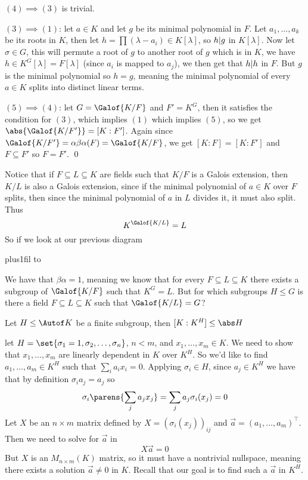 $(4)\implies(3)$ is trivial.

$(3)\implies(1)$: let $a\in K$ and let $g$ be its minimal polynomial in $F$.
Let $a_1,\dots,a_k$ be its roots in $K$, then let $h=\prod(\lambda-a_i)\in K[\lambda]$, so $h{\mid} g$ in $K[\lambda]$.
Now let $\sigma\in G$, this will permute a root of $g$ to another root of $g$ which is in $K$, we have $h\in K^G[\lambda]=F[\lambda]$ (since $a_i$ is mapped to $a_j$), we then get that $h{\mid} h$ in $F$.
But $g$ is the minimal polynomial so $h=g$, meaning the minimal polynomial of every $a\in K$ splits into distinct linear terms.

$(5)\implies(4)$: let $G=\Galof{K/F}$ and $F'=K^G$, then it satisfies the condition for $(3)$, which implies $(1)$ which implies $(5)$, so we get $\abs{\Galof{K/F'}}=[K:F']$.
Again since $\Galof{K/F'}=\alpha\beta\alpha(F)=\Galof{K/F}$, we get $[K:F]=[K:F']$ and $F\subseteq F'$ so $F=F'$.
\qed

Notice that if $F\subseteq L\subseteq K$ are fields such that $K/F$ is a Galois extension, then $K/L$ is also a Galois extension, since if the minimal polynomial of $a\in K$ over $F$ splits, then since the
minimal polynomial of $a$ in $L$ divides it, it must also split.
Thus
$$ K^{\Galof{K/L}} = L $$
So if we look at our previous diagram

\medskip
{\tabskip=0pt plus1fil
\offinterlineskip\halign to}
\medskip

We have that $\beta\alpha=1$, meaning we know that for every $F\subseteq L\subseteq K$ there exists a subgroup of $\Galof{K/F}$ such that $K^G=L$.
But for which subgroups $H\leq G$ is there a field $F\subseteq L\subseteq K$ such that $\Galof{K/L}=G$?

\blemm[title=Artin's Lemma, name=artinlemma]

    Let $H\leq\Autof K$ be a finite subgroup, then $[K:K^H]\leq\abs H$

\elemm

\Proof let $H=\set{\sigma_1=1,\sigma_2,\dots,\sigma_n}$, $n<m$, and $x_1,\dots,x_m\in K$.
We need to show that $x_1,\dots,x_m$ are linearly dependent in $K$ over $K^H$.
So we'd like to find $a_1,\dots,a_m\in K^H$ such that $\sum_ia_ix_i=0$.
Applying $\sigma_i\in H$, since $a_j\in K^H$ we have that by definition $\sigma_ia_j=a_j$ so
$$ \sigma_i\parens{\sum_ja_jx_j} = \sum_ja_j\sigma_i(x_j) = 0 $$
Let $X$ be an $n\times m$ matrix defined by $X=(\sigma_i(x_j))_{ij}$ and $\vec a=(a_1,\dots,a_m)^\top$.
Then we need to solve for $\vec a$ in
$$ X\vec a = 0 $$
But $X$ is an $M_{n\times m}(K)$ matrix, so it must have a nontrivial nullspace, meaning there exists a solution $\vec a\neq0$ in $K$.
Recall that our goal is to find such a $\vec a$ in $K^H$.


